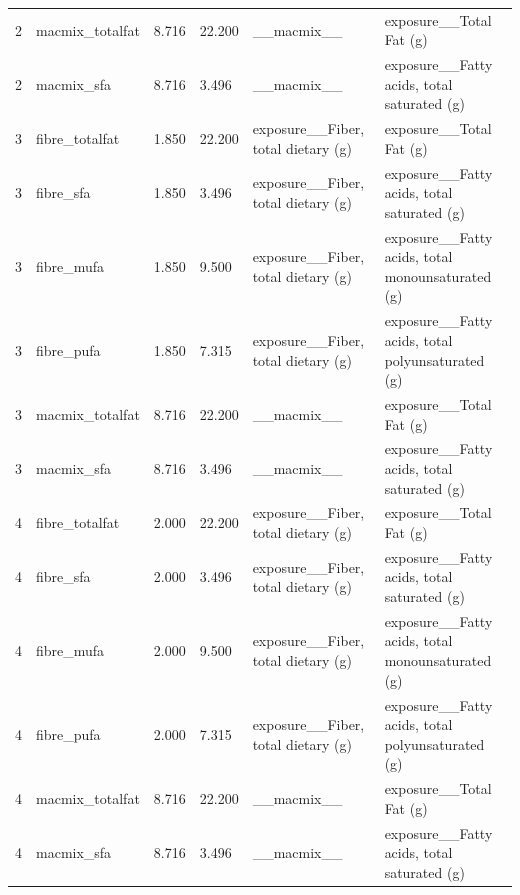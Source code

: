 {\begin{longtable}{llllll}
2 & macmix\_totalfat & 8.716 & 22.200 & \_\_macmix\_\_ & exposure\_\_Total Fat (g) \\
2 & macmix\_sfa & 8.716 & 3.496 & \_\_macmix\_\_ & exposure\_\_Fatty acids, total saturated (g) \\
3 & fibre\_totalfat & 1.850 & 22.200 & exposure\_\_Fiber, total dietary (g) & exposure\_\_Total Fat (g) \\
3 & fibre\_sfa & 1.850 & 3.496 & exposure\_\_Fiber, total dietary (g) & exposure\_\_Fatty acids, total saturated (g) \\
3 & fibre\_mufa & 1.850 & 9.500 & exposure\_\_Fiber, total dietary (g) & exposure\_\_Fatty acids, total monounsaturated (g) \\
3 & fibre\_pufa & 1.850 & 7.315 & exposure\_\_Fiber, total dietary (g) & exposure\_\_Fatty acids, total polyunsaturated (g) \\
3 & macmix\_totalfat & 8.716 & 22.200 & \_\_macmix\_\_ & exposure\_\_Total Fat (g) \\
3 & macmix\_sfa & 8.716 & 3.496 & \_\_macmix\_\_ & exposure\_\_Fatty acids, total saturated (g) \\
4 & fibre\_totalfat & 2.000 & 22.200 & exposure\_\_Fiber, total dietary (g) & exposure\_\_Total Fat (g) \\
4 & fibre\_sfa & 2.000 & 3.496 & exposure\_\_Fiber, total dietary (g) & exposure\_\_Fatty acids, total saturated (g) \\
4 & fibre\_mufa & 2.000 & 9.500 & exposure\_\_Fiber, total dietary (g) & exposure\_\_Fatty acids, total monounsaturated (g) \\
4 & fibre\_pufa & 2.000 & 7.315 & exposure\_\_Fiber, total dietary (g) & exposure\_\_Fatty acids, total polyunsaturated (g) \\
4 & macmix\_totalfat & 8.716 & 22.200 & \_\_macmix\_\_ & exposure\_\_Total Fat (g) \\
4 & macmix\_sfa & 8.716 & 3.496 & \_\_macmix\_\_ & exposure\_\_Fatty acids, total saturated (g) \\
\bottomrule
\end{longtable}}
